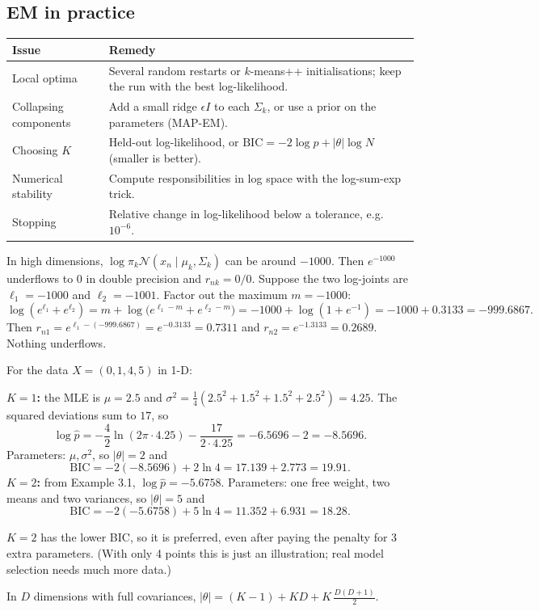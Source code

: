 \documentclass[11pt,a4paper]{article}
\newcommand{\N}{\mathcal{N}}
\begin{document}
\subsection{EM in practice}\label{sec:practice}

\begin{center}
\renewcommand{\arraystretch}{1.25}
\begin{tabular}{@{}p{3.3cm}p{11.7cm}@{}}
\toprule
Issue & Remedy\\
\midrule
Local optima & Several random restarts or $k$-means++ initialisations; keep the run with the best log-likelihood.\\
Collapsing components & Add a small ridge $\epsilon I$ to each $\Sigma_k$, or use a prior on the parameters (MAP-EM).\\
Choosing $K$ & Held-out log-likelihood, or $\mathrm{BIC}=-2\log\hat p+|\theta|\log N$ (smaller is better).\\
Numerical stability & Compute responsibilities in log space with the log-sum-exp trick.\\
Stopping & Relative change in log-likelihood below a tolerance, e.g.\ $10^{-6}$.\\
\bottomrule
\end{tabular}
\end{center}

\begin{example}
In high dimensions, $\log\pi_k\N(x_n\mid\mu_k,\Sigma_k)$ can be around $-1000$. Then $e^{-1000}$ underflows to $0$ in double precision and $r_{nk}=0/0$. Suppose the two log-joints are $\ell_1=-1000$ and $\ell_2=-1001$. Factor out the maximum $m=-1000$:
\[
\log(e^{\ell_1}+e^{\ell_2})=m+\log\big(e^{\ell_1-m}+e^{\ell_2-m}\big)=-1000+\log(1+e^{-1})=-1000+0.3133=-999.6867.
\]
Then $r_{n1}=e^{\ell_1-(-999.6867)}=e^{-0.3133}=0.7311$ and $r_{n2}=e^{-1.3133}=0.2689$. Nothing underflows.
\end{example}

\begin{example}
For the data $X=(0,1,4,5)$ in 1-D:

\textbf{$K=1$:} the MLE is $\mu=2.5$ and $\sigma^2=\frac14(2.5^2+1.5^2+1.5^2+2.5^2)=4.25$. The squared deviations sum to $17$, so
\[
\log\hat p=-\frac{4}{2}\ln(2\pi\cdot4.25)-\frac{17}{2\cdot4.25}=-6.5696-2=-8.5696.
\]
Parameters: $\mu,\sigma^2$, so $|\theta|=2$ and
\[
\mathrm{BIC}=-2(-8.5696)+2\ln4=17.139+2.773=\mathbf{19.91}.
\]
\textbf{$K=2$:} from Example 3.1, $\log\hat p=-5.6758$. Parameters: one free weight, two means and two variances, so $|\theta|=5$ and
\[
\mathrm{BIC}=-2(-5.6758)+5\ln4=11.352+6.931=\mathbf{18.28}.
\]

$K=2$ has the lower BIC, so it is preferred, even after paying the penalty for 3 extra parameters. (With only 4 points this is just an illustration; real model selection needs much more data.)

In $D$ dimensions with full covariances, $|\theta|=(K-1)+KD+K\,\frac{D(D+1)}{2}$.
\end{example}
\end{document}
